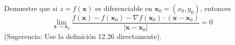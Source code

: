\item Demuestre que si $z = f(\mathbf{x})$ es diferenciable en $\mathbf{x}_0 = (x_0, y_0)$, entonces
\[ \lim_{\mathbf{x} \to \mathbf{x}_0} \frac{f(\mathbf{x}) - f(\mathbf{x}_0) - \nabla f(\mathbf{x}_0) \cdot (\mathbf{x} - \mathbf{x}_0)}{|\mathbf{x} - \mathbf{x}_0|} = 0 \]
(Sugerencia: Use la definición 12.26 directamente).
